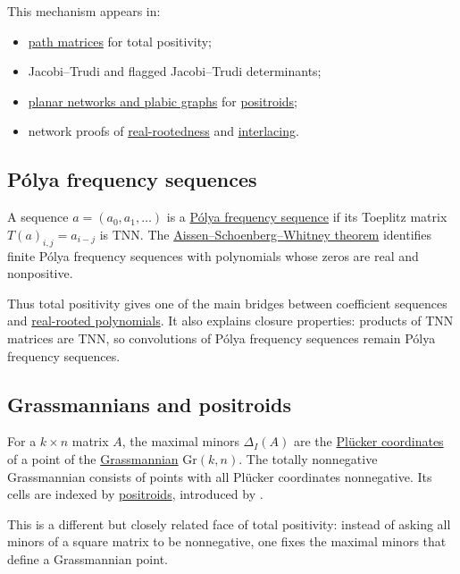 This mechanism appears in:
\begin{itemize}
\item \hyperref[tnnPathMatrix]{path matrices} for total positivity;
\item Jacobi--Trudi and flagged Jacobi--Trudi determinants;
\item \hyperref[positroidNetworks]{planar networks and plabic graphs} for
\hyperref[positroid]{positroids};
\item network proofs of \hyperref[realRootedPolynomial]{real-rootedness} and
\hyperref[interlacingPolynomials]{interlacing}.
\end{itemize}

\subsection[totalPositivityPF]{Pólya frequency sequences}

A sequence \(a=(a_0,a_1,\dotsc)\) is a
\hyperref[polyaFrequencySequenceDefinition]{Pólya frequency sequence} if its
Toeplitz matrix \(T(a)_{i,j}=a_{i-j}\) is TNN.  The
\hyperref[aissenSchoenbergWhitney]{Aissen--Schoenberg--Whitney theorem}
identifies finite Pólya frequency sequences with polynomials whose zeros are
real and nonpositive.

Thus total positivity gives one of the main bridges between coefficient
sequences and \hyperref[realRootedPolynomial]{real-rooted polynomials}.
It also explains closure properties: products of TNN matrices are TNN, so
convolutions of Pólya frequency sequences remain Pólya frequency sequences.

\subsection[totalPositivityGrassmannians]{Grassmannians and positroids}

For a \(k\times n\) matrix \(A\), the maximal minors \(\Delta_I(A)\) are the
\hyperref[pluckerCoordinate]{Plücker coordinates} of a point of the
\hyperref[grassmannianVarieties]{Grassmannian} \(\mathrm{Gr}(k,n)\).
The totally nonnegative Grassmannian consists of points with all Plücker
coordinates nonnegative.  Its cells are indexed by
\hyperref[positroid]{positroids}, introduced by 
\cite{Postnikov2006x}.

This is a different but closely related face of total positivity: instead of
asking all minors of a square matrix to be nonnegative, one fixes the maximal
minors that define a Grassmannian point.

